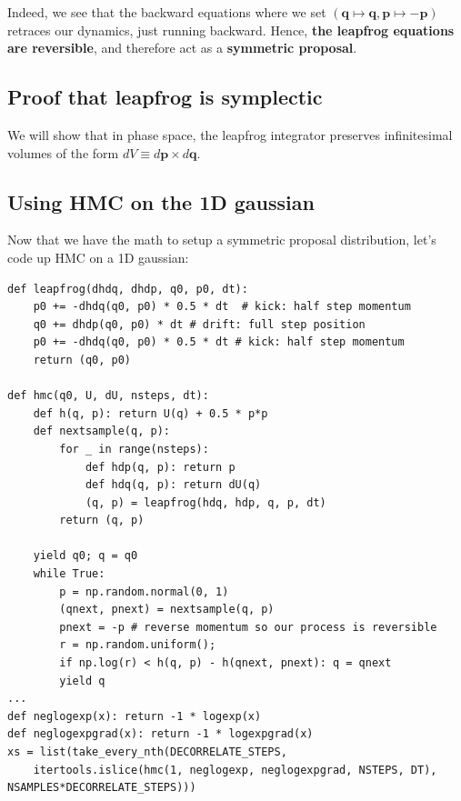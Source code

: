 \documentclass[titlepage]{article}
\newcommand{\p}{\mathbf{p}}
\newcommand{\q}{\mathbf{q}}
\begin{document}
Indeed, we see that the backward equations where we set $(\q \mapsto \q, \p \mapsto -\p)$
retraces our dynamics, just running backward. Hence, \textbf{the leapfrog equations are reversible},
and therefore act as a \textbf{symmetric proposal}.



\subsection{Proof that leapfrog is symplectic}

We will show that in phase space, the leapfrog integrator preserves infinitesimal
volumes of the form $dV \equiv d\p \times d\q$.


\subsection{Using HMC on the 1D gaussian}

Now that we have the math to setup a symmetric proposal distribution, let's
code up HMC on a 1D gaussian:

{\footnotesize

\begin{verbatim}
def leapfrog(dhdq, dhdp, q0, p0, dt):
    p0 += -dhdq(q0, p0) * 0.5 * dt  # kick: half step momentum
    q0 += dhdp(q0, p0) * dt # drift: full step position
    p0 += -dhdq(q0, p0) * 0.5 * dt # kick: half step momentum
    return (q0, p0)

def hmc(q0, U, dU, nsteps, dt):
    def h(q, p): return U(q) + 0.5 * p*p
    def nextsample(q, p):
        for _ in range(nsteps):
            def hdp(q, p): return p
            def hdq(q, p): return dU(q)
            (q, p) = leapfrog(hdq, hdp, q, p, dt)
        return (q, p)

    yield q0; q = q0
    while True:
        p = np.random.normal(0, 1)
        (qnext, pnext) = nextsample(q, p)
        pnext = -p # reverse momentum so our process is reversible
        r = np.random.uniform(); 
        if np.log(r) < h(q, p) - h(qnext, pnext): q = qnext
        yield q
...
def neglogexp(x): return -1 * logexp(x)
def neglogexpgrad(x): return -1 * logexpgrad(x)
xs = list(take_every_nth(DECORRELATE_STEPS, 
    itertools.islice(hmc(1, neglogexp, neglogexpgrad, NSTEPS, DT), NSAMPLES*DECORRELATE_STEPS)))
\end{verbatim}
}
\end{document}
